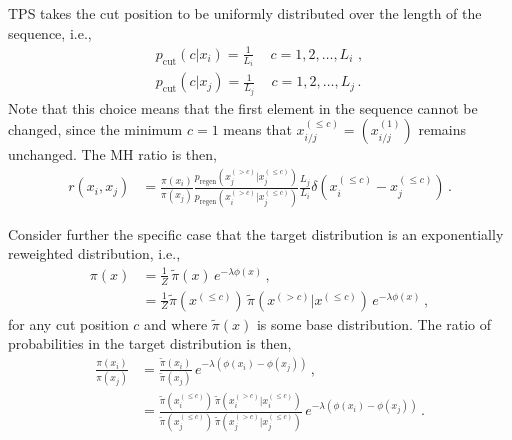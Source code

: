 \documentclass{article}
\begin{document}
TPS takes the cut position to be uniformly distributed over the length of the sequence, i.e.,
\begin{align}
    p_{\text{cut}}(c | x_{i}) = \frac{1}{L_i} \,\quad c = 1, 2, \ldots, L_i \,\,, \\
    p_{\text{cut}}(c | x_{j}) = \frac{1}{L_j} \,\quad c = 1, 2, \ldots, L_j \,.
\end{align}
Note that this choice means that the first element in the sequence cannot be changed, since the minimum $c=1$ means that $x_{i/j}^{(\le c)} = (x_{i/j}^{(1)})$ remains unchanged. The MH ratio is then,
\begin{align}
    r(x_{i}, x_{j}) & = \frac{\pi(x_{i})}{\pi(x_{j})} \frac{p_{\text{regen}}(x_{j}^{(> c)} | x_{j}^{(\le c)})}{p_{\text{regen}}(x_{i}^{(> c)} | x_{j}^{(\le c)})} \frac{L_j}{L_i} \delta(x_{i}^{(\le c)} - x_{j}^{(\le c)}) \,.
\end{align}

Consider further the specific case that the target distribution is an exponentially reweighted distribution, i.e.,
\begin{align}
    \pi(x) & = \frac{1}{Z} \, \tilde{\pi}(x) \, e^{-\lambda \phi(x)} \,,                                                \\
           & = \frac{1}{Z} \tilde{\pi}(x^{(\le c)}) \, \tilde{\pi}(x^{(> c)} | x^{(\le c)}) \, e^{-\lambda \phi(x)} \,,
\end{align}
for any cut position $c$ and where $\tilde{\pi}(x)$ is some base distribution. The ratio of probabilities in the target distribution is then,
\begin{align}
    \frac{\pi(x_{i})}{\pi(x_{j})} & = \frac{\tilde{\pi}(x_{i})}{\tilde{\pi}(x_{j})} \, e^{-\lambda \left(\phi(x_{i}) - \phi(x_{j})\right)} \,,                                                                                                                     \\
                                  & = \frac{\tilde{\pi}(x_{i}^{(\le c)}) \, \tilde{\pi}(x_{i}^{(> c)} | x_{i}^{(\le c)})}{\tilde{\pi}(x_{j}^{(\le c)}) \, \tilde{\pi}(x_{j}^{(> c)} | x_{j}^{(\le c)})} \, e^{-\lambda \left(\phi(x_{i}) - \phi(x_{j})\right)} \,.
\end{align}
\end{document}
